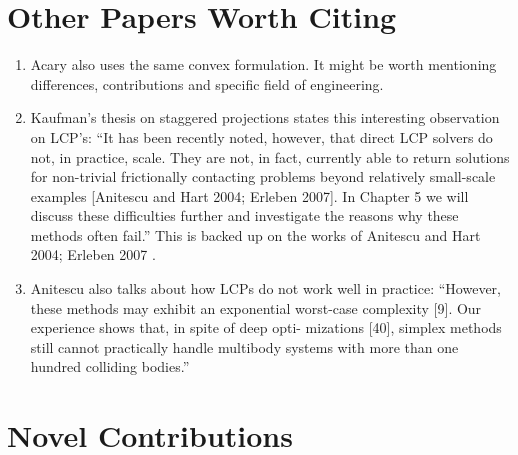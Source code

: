 \section{Other Papers Worth Citing}

\begin{enumerate}
	\item Acary \cite{bib:acary2011formulation} also uses the same convex
	formulation. It might be worth mentioning differences, contributions and
	specific field of engineering.
	\item Kaufman's thesis on staggered projections
	\cite{bib:kaufman2009coupled} states this interesting observation on LCP's:
	``It has been recently noted, however, that direct LCP solvers do not, in
	practice, scale. They are not, in fact, currently able to return solutions
	for non-trivial frictionally contacting problems beyond relatively
	small-scale examples [Anitescu and Hart 2004; Erleben 2007]. In Chapter 5 we
	will discuss these difficulties further and investigate the reasons why
	these methods often fail.'' This is backed up on the works of Anitescu and
	Hart 2004; Erleben 2007 \cite{bib:anitescu2004fixed,bib:erleben2007velocity}.
	\item Anitescu \cite{bib:anitescu2010} also talks about how LCPs do not work
	well in practice: ``However, these methods may exhibit an exponential
	worst-case complexity [9]. Our experience shows that, in spite of deep opti-
	mizations [40], simplex methods still cannot practically handle multibody
	systems with more than one hundred colliding bodies.''
\end{enumerate}

\section{Novel Contributions}

